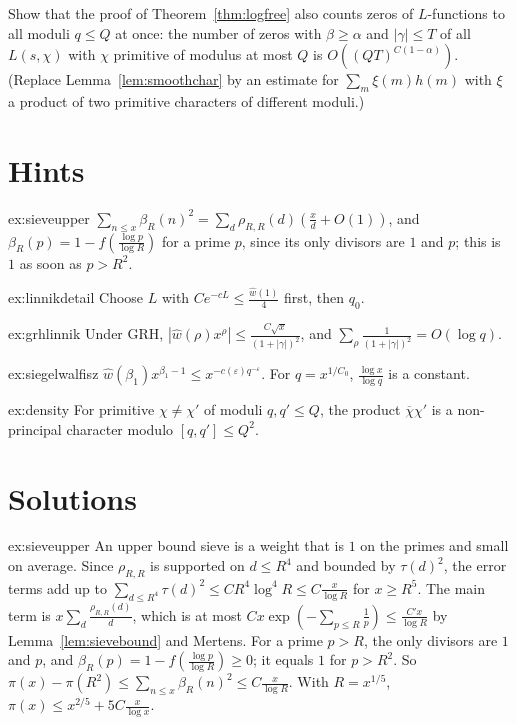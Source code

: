 \begin{exercise}[$\star\star\star$]\label{ex:density}
Show that the proof of Theorem~\ref{thm:logfree} also counts zeros of $L$-functions to all moduli $q\le Q$ at once: the number of zeros with $\beta\ge\alpha$ and $|\gamma|\le T$ of all $L(s,\chi)$ with $\chi$ primitive of modulus at most $Q$ is $O((QT)^{C(1-\alpha)})$. (Replace Lemma~\ref{lem:smoothchar} by an estimate for $\sum_m\xi(m)h(m)$ with $\xi$ a product of two primitive characters of different moduli.)
\end{exercise}

\section{Hints}

\begin{hint}{ex:sieveupper}
$\sum_{n\le x}\beta_R(n)^2=\sum_d\rho_{R,R}(d)(\frac xd+O(1))$, and $\beta_R(p)=1-f(\frac{\log p}{\log R})$ for a prime $p$, since its only divisors are $1$ and $p$; this is $1$ as soon as $p>R^2$.
\end{hint}
\begin{hint}{ex:linnikdetail}
Choose $L$ with $Ce^{-cL}\le\frac{\hat w(1)}4$ first, then $q_0$.
\end{hint}
\begin{hint}{ex:grhlinnik}
Under GRH, $|\hat w(\rho)x^\rho|\le\frac{C\sqrt x}{(1+|\gamma|)^2}$, and $\sum_\rho\frac1{(1+|\gamma|)^2}=O(\log q)$.
\end{hint}
\begin{hint}{ex:siegelwalfisz}
$\hat w(\beta_1)x^{\beta_1-1}\le x^{-c(\varepsilon)q^{-\varepsilon}}$. For $q=x^{1/C_0}$, $\frac{\log x}{\log q}$ is a constant.
\end{hint}
\begin{hint}{ex:density}
For primitive $\chi\ne\chi'$ of moduli $q,q'\le Q$, the product $\overline\chi\chi'$ is a non-principal character modulo $[q,q']\le Q^2$.
\end{hint}

\section{Solutions}

\begin{solution}{ex:sieveupper}
\idea An upper bound sieve is a weight that is $1$ on the primes and small on average.
\writeup Since $\rho_{R,R}$ is supported on $d\le R^4$ and bounded by $\tau(d)^2$, the error terms add up to $\sum_{d\le R^4}\tau(d)^2\le CR^4\log^4R\le C\frac x{\log R}$ for $x\ge R^5$. The main term is $x\sum_d\frac{\rho_{R,R}(d)}d$, which is at most $Cx\exp(-\sum_{p\le R}\frac1p)\le\frac{C'x}{\log R}$ by Lemma~\ref{lem:sievebound} and Mertens. For a prime $p>R$, the only divisors are $1$ and $p$, and $\beta_R(p)=1-f(\frac{\log p}{\log R})\ge0$; it equals $1$ for $p>R^2$. So $\pi(x)-\pi(R^2)\le\sum_{n\le x}\beta_R(n)^2\le C\frac x{\log R}$. With $R=x^{1/5}$, $\pi(x)\le x^{2/5}+5C\frac x{\log x}$.
\end{solution}

